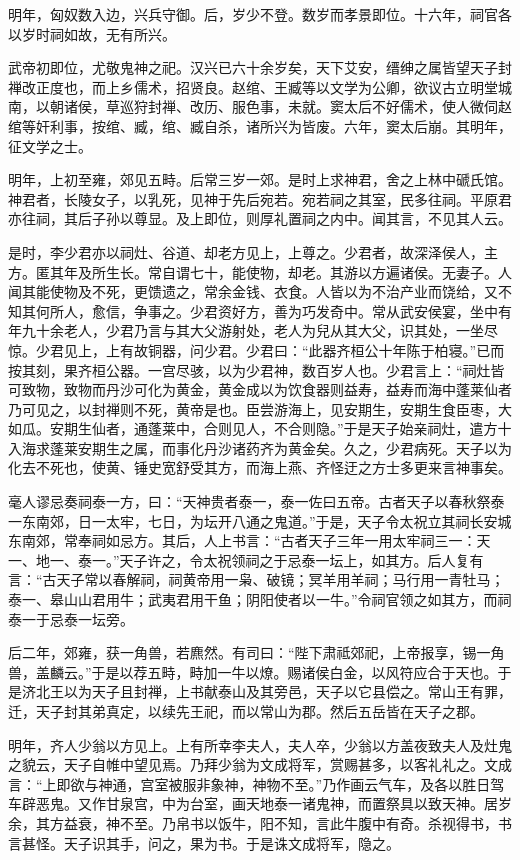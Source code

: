 \documentclass[]{article}
\begin{document}
明年，匈奴数入边，兴兵守御。后，岁少不登。数岁而孝景即位。十六年，祠官各以岁时祠如故，无有所兴。

武帝初即位，尤敬鬼神之祀。汉兴已六十余岁矣，天下艾安，缙绅之属皆望天子封禅改正度也，而上乡儒术，招贤良。赵绾、王臧等以文学为公卿，欲议古立明堂城南，以朝诸侯，草巡狩封禅、改历、服色事，未就。窦太后不好儒术，使人微伺赵绾等奸利事，按绾、臧，绾、臧自杀，诸所兴为皆废。六年，窦太后崩。其明年，征文学之士。

明年，上初至雍，郊见五畤。后常三岁一郊。是时上求神君，舍之上林中磃氏馆。神君者，长陵女子，以乳死，见神于先后宛若。宛若祠之其室，民多往祠。平原君亦往祠，其后子孙以尊显。及上即位，则厚礼置祠之内中。闻其言，不见其人云。

是时，李少君亦以祠灶、谷道、却老方见上，上尊之。少君者，故深泽侯人，主方。匿其年及所生长。常自谓七十，能使物，却老。其游以方遍诸侯。无妻子。人闻其能使物及不死，更馈遗之，常余金钱、衣食。人皆以为不治产业而饶给，又不知其何所人，愈信，争事之。少君资好方，善为巧发奇中。常从武安侯宴，坐中有年九十余老人，少君乃言与其大父游射处，老人为兒从其大父，识其处，一坐尽惊。少君见上，上有故铜器，问少君。少君曰：``此器齐桓公十年陈于柏寝。''已而按其刻，果齐桓公器。一宫尽骇，以为少君神，数百岁人也。少君言上：``祠灶皆可致物，致物而丹沙可化为黄金，黄金成以为饮食器则益寿，益寿而海中蓬莱仙者乃可见之，以封禅则不死，黄帝是也。臣尝游海上，见安期生，安期生食臣枣，大如瓜。安期生仙者，通蓬莱中，合则见人，不合则隐。''于是天子始亲祠灶，遣方十入海求蓬莱安期生之属，而事化丹沙诸药齐为黄金矣。久之，少君病死。天子以为化去不死也，使黄、锤史宽舒受其方，而海上燕、齐怪迂之方士多更来言神事矣。

毫人谬忌奏祠泰一方，曰：``天神贵者泰一，泰一佐曰五帝。古者天子以春秋祭泰一东南郊，日一太牢，七日，为坛开八通之鬼道。''于是，天子令太祝立其祠长安城东南郊，常奉祠如忌方。其后，人上书言：``古者天子三年一用太牢祠三一：天一、地一、泰一。''天子许之，令太祝领祠之于忌泰一坛上，如其方。后人复有言：``古天子常以春解祠，祠黄帝用一枭、破镜；冥羊用羊祠；马行用一青牡马；泰一、皋山山君用牛；武夷君用干鱼；阴阳使者以一牛。''令祠官领之如其方，而祠泰一于忌泰一坛旁。

后二年，郊雍，获一角兽，若麃然。有司曰：``陛下肃祗郊祀，上帝报享，锡一角兽，盖麟云。''于是以荐五畤，畤加一牛以燎。赐诸侯白金，以风符应合于天也。于是济北王以为天子且封禅，上书献泰山及其旁邑，天子以它县偿之。常山王有罪，迁，天子封其弟真定，以续先王祀，而以常山为郡。然后五岳皆在天子之郡。

明年，齐人少翁以方见上。上有所幸李夫人，夫人卒，少翁以方盖夜致夫人及灶鬼之貌云，天子自帷中望见焉。乃拜少翁为文成将军，赏赐甚多，以客礼礼之。文成言：``上即欲与神通，宫室被服非象神，神物不至。''乃作画云气车，及各以胜日驾车辟恶鬼。又作甘泉宫，中为台室，画天地泰一诸鬼神，而置祭具以致天神。居岁余，其方益衰，神不至。乃帛书以饭牛，阳不知，言此牛腹中有奇。杀视得书，书言甚怪。天子识其手，问之，果为书。于是诛文成将军，隐之。
\end{document}
